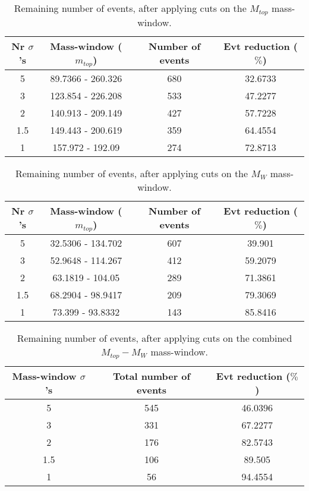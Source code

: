\documentclass{article}
\begin{document}
 \begin{table}[h!t] 
  \caption{Remaining number of events, after applying cuts on the $M_{top}$ mass-window.} 
  \centering 
   \begin{tabular}{c|c|c|c|}
     Nr $\sigma$'s & Mass-window ($m_{top}$)   & Number of events   & Evt reduction ($\%$)     \\
     \hline
     5 & 89.7366 - 260.326  &   680 &  32.6733 \\ 
     3 & 123.854 - 226.208  &   533 &  47.2277 \\ 
     2 & 140.913 - 209.149  &   427 &  57.7228 \\ 
     1.5 & 149.443 - 200.619  &   359 &  64.4554 \\ 
     1 & 157.972 - 192.09  &   274 &  72.8713 \\ 
   \end{tabular} 
 \end{table} 
 
 \begin{table}[h!t] 
  \caption{Remaining number of events, after applying cuts on the $M_{W}$ mass-window.} 
  \centering 
   \begin{tabular}{c|c|c|c|}
     Nr $\sigma$'s & Mass-window ($m_{top}$)    & Number of events   & Evt reduction ($\%$)    \\
     \hline
     5 & 32.5306 - 134.702  &   607 & 39.901 \\ 
     3 & 52.9648 - 114.267  &   412 & 59.2079 \\ 
     2 & 63.1819 - 104.05  &   289 & 71.3861 \\ 
     1.5 & 68.2904 - 98.9417  &   209 & 79.3069 \\ 
     1 & 73.399 - 93.8332  &   143 & 85.8416 \\ 
   \end{tabular} 
 \end{table} 
 
 \begin{table}[h!t] 
  \caption{Remaining number of events, after applying cuts on the combined $M_{top}-M_{W}$ mass-window.} 
  \centering 
   \begin{tabular}{c|c|c|} 
     Mass-window $\sigma$'s & Total number of events    & Evt reduction ($\%$)     \\ 
     \hline
     5 & 545 & 46.0396 \\ 
     3 & 331 & 67.2277 \\ 
     2 & 176 & 82.5743 \\ 
     1.5 & 106 & 89.505 \\ 
     1 & 56 & 94.4554 \\ 
   \end{tabular} 
 \end{table} 
 
\end{document}
